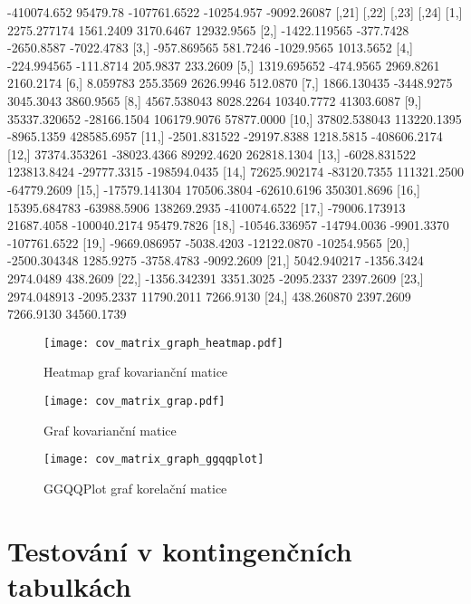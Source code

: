 \documentclass[a4paper, 12pt]{article}
\begin{document}
\begin{Schunk}
\begin{Soutput}
[24,]  -410074.652    95479.78  -107761.6522   -10254.957   -9092.26087
              [,21]       [,22]        [,23]        [,24]
 [1,]   2275.277174   1561.2409    3170.6467   12932.9565
 [2,]  -1422.119565   -377.7428   -2650.8587   -7022.4783
 [3,]   -957.869565    581.7246   -1029.9565    1013.5652
 [4,]   -224.994565   -111.8714     205.9837     233.2609
 [5,]   1319.695652   -474.9565    2969.8261    2160.2174
 [6,]      8.059783    255.3569    2626.9946     512.0870
 [7,]   1866.130435  -3448.9275    3045.3043    3860.9565
 [8,]   4567.538043   8028.2264   10340.7772   41303.6087
 [9,]  35337.320652 -28166.1504  106179.9076   57877.0000
[10,]  37802.538043 113220.1395   -8965.1359  428585.6957
[11,]  -2501.831522 -29197.8388    1218.5815 -408606.2174
[12,]  37374.353261 -38023.4366   89292.4620  262818.1304
[13,]  -6028.831522 123813.8424  -29777.3315 -198594.0435
[14,]  72625.902174 -83120.7355  111321.2500  -64779.2609
[15,] -17579.141304 170506.3804  -62610.6196  350301.8696
[16,]  15395.684783 -63988.5906  138269.2935 -410074.6522
[17,] -79006.173913  21687.4058 -100040.2174   95479.7826
[18,] -10546.336957 -14794.0036   -9901.3370 -107761.6522
[19,]  -9669.086957  -5038.4203  -12122.0870  -10254.9565
[20,]  -2500.304348   1285.9275   -3758.4783   -9092.2609
[21,]   5042.940217  -1356.3424    2974.0489     438.2609
[22,]  -1356.342391   3351.3025   -2095.2337    2397.2609
[23,]   2974.048913  -2095.2337   11790.2011    7266.9130
[24,]    438.260870   2397.2609    7266.9130   34560.1739
\end{Soutput}
\end{Schunk}

\begin{figure}[H]
\centering

\texttt{[image: cov\_matrix\_graph\_heatmap.pdf]}
\caption{Heatmap graf kovarianční matice}

\texttt{[image: cov\_matrix\_grap.pdf]}
\caption{Graf kovarianční matice}
\end{figure}

\begin{figure}[H]
\centering
\texttt{[image: cov\_matrix\_graph\_ggqqplot]}
\caption{GGQQPlot graf korelační matice}

\end{figure}

\section{Testování v kontingenčních tabulkách}
\end{document}
